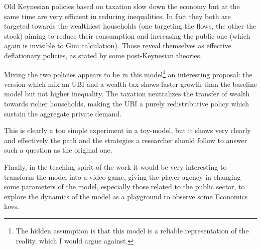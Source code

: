 Old Keynesian policies based on taxation slow down the economy but at the same time are very efficient in reducing inequalities.
In fact they both are targeted towards the wealthiest households (one targeting the flows, the other the stock) aiming to reduce their consumption and increasing the public one (which again is invisible to Gini calculation).
Those reveal themselves as effective deflationary policies, as stated by some post-Keynesian theories.

Mixing the two policies appears to be in this model\footnote{The hidden assumption is that this model is a reliable representation of the reality, which I would argue against.} an interesting proposal: the version which mix an UBI and a wealth tax shows faster growth than the baseline model but not higher inequality.
The taxation neutralizes the transfer of wealth towards richer households, making the UBI a purely redistributive policy which sustain the aggregate private demand.

This is clearly a too simple experiment in a toy-model, but it shows very clearly and effectively the path and the strategies a researcher should follow to answer such a question as the original one.

Finally, in the teaching spirit of the work it would be very interesting to transform the model into a video game, giving the player agency in changing some parameters of the model, especially those related to the public sector, to explore the dynamics of the model as a playground to observe some Economics laws.